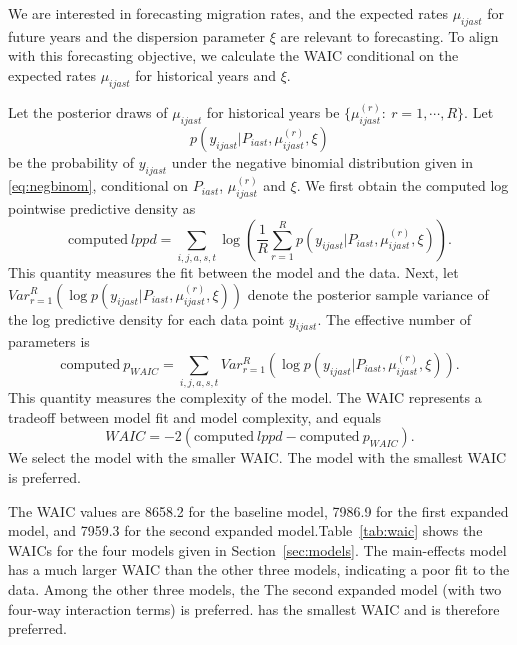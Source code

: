 \documentclass{article}
\begin{document}
{{\color{magenta}We are interested in forecasting migration rates, and the expected rates $\mu_{ijast}$ for future years and the dispersion parameter $\xi$ are relevant to forecasting. To align with this forecasting objective, we calculate the WAIC conditional on the expected rates $\mu_{ijast}$ for historical years and $\xi$.}

{\color{magenta}Let the posterior draws of $\mu_{ijast}$ for historical years be $\{\mu_{ijast}^{(r)}:\ r=1,\cdots,R\}$. Let $$p\left(y_{ijast}|P_{iast},\mu_{ijast}^{(r)},\xi\right)$$ be the probability of $y_{ijast}$ under the negative binomial distribution given in \eqref{eq:negbinom}, conditional on $P_{iast}$, $\mu_{ijast}^{(r)}$ and $\xi$. We first obtain the computed log pointwise predictive density as
\begin{equation}
\text{computed}\ lppd=\sum_{i,j,a,s,t}\log\left(\frac{1}{R}\sum_{r=1}^R p\left(y_{ijast}|P_{iast},\mu_{ijast}^{(r)},\xi\right)\right).
\end{equation}
This quantity measures the fit between the model and the data.
Next, let $Var_{r=1}^R \left(\log p\left(y_{ijast}|P_{iast},\mu_{ijast}^{(r)},\xi\right)\right)$ denote the posterior sample variance of the log predictive density for each data point $y_{ijast}$. The effective number of parameters is 
\begin{equation}
\text{computed}\ p_{WAIC}=\sum_{i,j,a,s,t}Var_{r=1}^R \left(\log p\left(y_{ijast}|P_{iast},\mu_{ijast}^{(r)},\xi\right)\right).
\end{equation}}
This quantity measures the complexity of the model. The WAIC represents a tradeoff between model fit and model complexity, and equals 
\begin{equation}
WAIC=-2(\text{computed}\ lppd-\text{computed}\ p_{WAIC}).
\end{equation}
{\color{yellow}We select the model with the smaller WAIC.} {\color{magenta}The model with the smallest WAIC is preferred.}



{\color{yellow}The WAIC values are 8658.2 for the baseline model, 7986.9 for the first expanded model, and 7959.3 for the second expanded model.}{\color{magenta}Table~\ref{tab:waic} shows the WAICs for the four models given in Section~\ref{sec:models}. The main-effects model has a much larger WAIC than the other three models, indicating a poor fit to the data. Among the other three models, the} {\color{yellow}The} second expanded model (with two four-way interaction terms) {\color{yellow}is preferred.} {\color{magenta}has the smallest WAIC and is therefore preferred.}

}
\end{document}
